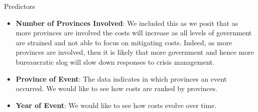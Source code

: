 \begin{frame}{Predictors}
\begin{itemize}

	\item \textbf{Number of Provinces Involved}: We included this as we posit that as more provinces are involved the costs will increase as all levels of government are strained and not able to focus on mitigating costs. Indeed, as more provinces are involved, then it is likely that more government and hence more bureaucratic slog will slow down responses to crisis management.
	\item \textbf{Province of Event}: The data indicates in which provinces an event occurred. We would like to see how costs are ranked by provinces.
	\item \textbf{Year of Event}: We would like to see how costs evolve over time. 
\end{itemize}
\end{frame}

\begin{frame}{}
	
\end{frame}


